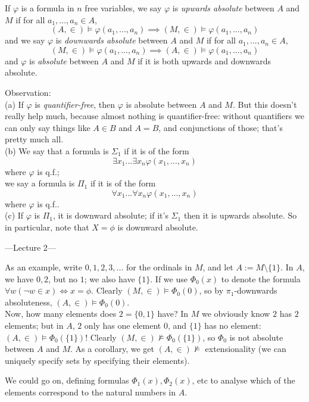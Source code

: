 \documentclass[a4paper]{article}
\begin{document}
\begin{defi}
If $\varphi$ is a formula in $n$ free variables, we say $\varphi$ is \emph{upwards absolute} between $A$ and $M$ if for all $a_1,...,a_n \in A$,
$$(A,\in) \vDash \varphi(a_1,...,a_n) \implies (M,\in) \vDash \varphi(a_1,...,a_n)$$
and we say $\varphi$ is \emph{downwards absolute} between $A$ and $M$ if for all $a_1,...,a_n \in A$,
$$(M,\in) \vDash \varphi(a_1,...,a_n) \implies (A,\in) \vDash \varphi(a_1,...,a_n)$$
and $\varphi$ is \emph{absolute} between $A$ and $M$ if it is both upwards and downwards absolute.
\end{defi}

Observation:\\
(a) If $\varphi$ is \emph{quantifier-free}, then $\varphi$ is absolute between $A$ and $M$. But this doesn't really help much, because almost nothing is quantifier-free: without quantifiers we can only say things like $A \in B$ and $A=B$, and conjunctions of those; that's pretty much all.\\
(b) We say that a formula is $\Sigma_1$ if it is of the form
$$\exists x_1 ... \exists x_n \varphi(x_1,...,x_n)$$
where $\varphi$ is q.f.;\\
we say a formula is $\Pi_1$ if it is of the form
$$\forall x_1 ... \forall x_n \varphi(x_1,...,x_n)$$
where $\varphi$ is q.f..\\
(c) If $\varphi$ is $\Pi_1$, it is downward absolute; if it's $\Sigma_1$ then it is upwards absolute. So in particular, note that $X=\phi$ is downward absolute.

---Lecture 2---

As an example, write $0,1,2,3,...$ for the ordinals in $M$, and let $A:=M \setminus \{1\}$. In $A$, we have $0,2$, but no $1$; we also have $\{1\}$. If we use $\Phi_0(x)$ to denote the formula $\forall w (\neg w \in x) \iff x = \phi$. Clearly $(M,\in) \vDash \Phi_0(0)$, so by $\pi_1$-downwards absoluteness, $(A,\in) \vDash \Phi_0(0)$.\\
Now, how many elements does $2=\{0,1\}$ have? In $M$ we obviously know $2$ has $2$ elements; but in $A$, $2$ only has one element $0$, and $\{1\}$ has no element: $(A,\in) \vDash \Phi_0(\{1\})$! Clearly $(M,\in) \not\vDash \Phi_0(\{1\})$, so $\Phi_0$ is not absolute between $A$ and $M$. As a corollary, we get $(A,\in) \not\vDash$ extensionality (we can uniquely specify sets by specifying their elements).

\begin{rem}
We could go on, defining formulas $\Phi_1(x),\Phi_2(x)$, etc to analyse which of the elements correspond to the natural numbers in $A$.
\end{rem}
\end{document}
